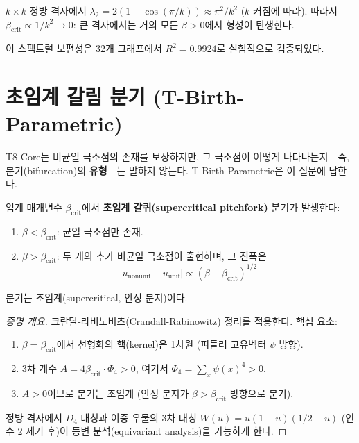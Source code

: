 \begin{example}
$k \times k$ 정방 격자에서 $\lambda_2 = 2(1 - \cos(\pi/k)) \approx \pi^2/k^2$ ($k$ 커짐에 따라). 따라서 $\beta_{\mathrm{crit}} \propto 1/k^2 \to 0$: 큰 격자에서는 거의 모든 $\beta > 0$에서 형성이 탄생한다.
\end{example}

이 스펙트럴 보편성은 32개 그래프에서 $R^2 = 0.9924$로 실험적으로 검증되었다.


\section{초임계 갈림 분기 (T-Birth-Parametric)}
\label{sec:pitchfork}

T8-Core는 비균일 극소점의 존재를 보장하지만, 그 극소점이 어떻게 나타나는지---즉, 분기(bifurcation)의 \textbf{유형}---는 말하지 않는다. T-Birth-Parametric은 이 질문에 답한다.

\begin{theorem}
\label{thm:T-Birth-Parametric}
임계 매개변수 $\beta_{\mathrm{crit}}$에서 \textbf{초임계 갈퀴(supercritical pitchfork)} 분기가 발생한다:
\begin{enumerate}
    \item $\beta < \beta_{\mathrm{crit}}$: 균일 극소점만 존재.
    \item $\beta > \beta_{\mathrm{crit}}$: 두 개의 추가 비균일 극소점이 출현하며, 그 진폭은
    \begin{equation}
        |u_{\mathrm{nonunif}} - u_{\mathrm{unif}}| \propto (\beta - \beta_{\mathrm{crit}})^{1/2}
    \end{equation}
\end{enumerate}
분기는 초임계(supercritical, 안정 분지)이다.
\end{theorem}

\begin{proof}[증명 개요]
크란달-라비노비츠(Crandall-Rabinowitz) 정리를 적용한다. 핵심 요소:
\begin{enumerate}
    \item $\beta = \beta_{\mathrm{crit}}$에서 선형화의 핵(kernel)은 1차원 (피들러 고유벡터 $\psi$ 방향).
    \item 3차 계수 $A = 4\beta_{\mathrm{crit}} \cdot \Phi_4 > 0$, 여기서 $\Phi_4 = \sum_x \psi(x)^4 > 0$.
    \item $A > 0$이므로 분기는 초임계 (안정 분지가 $\beta > \beta_{\mathrm{crit}}$ 방향으로 분기).
\end{enumerate}
정방 격자에서 $D_4$ 대칭과 이중-우물의 3차 대칭 $W(u) = u(1-u)(1/2 - u)$ (인수 $2$ 제거 후)이 등변 분석(equivariant analysis)을 가능하게 한다.
\end{proof}

